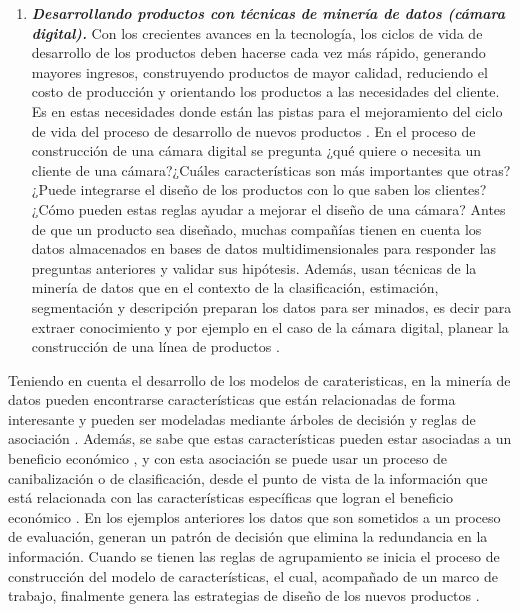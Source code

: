 \begin{enumerate}
\item \textbf{\textit{Desarrollando productos con técnicas de minería de datos (cámara digital).}} Con los crecientes avances en la tecnología, los ciclos de vida de desarrollo de los productos deben hacerse cada vez más rápido, generando mayores ingresos, construyendo productos de mayor calidad, reduciendo el costo de producción y orientando los productos a las necesidades del cliente. Es en estas necesidades donde están las pistas para el mejoramiento del ciclo de vida del proceso de desarrollo de nuevos productos \cite{Davril2015b}. En el proceso de construcción de una cámara digital se pregunta ¿qué quiere o necesita un cliente de una cámara?¿Cuáles características son más importantes que otras? ¿Puede integrarse el diseño de los productos con lo que saben los clientes? ¿Cómo pueden estas reglas ayudar a mejorar el diseño de una cámara?  Antes de que un producto sea diseñado, muchas compañías tienen en cuenta los datos almacenados en bases de datos multidimensionales para responder las preguntas anteriores y validar sus hipótesis. Además, usan técnicas de la minería de datos que en el contexto de la clasificación, estimación, segmentación y descripción preparan los datos para ser minados, es decir para extraer conocimiento y por ejemplo en el caso de la cámara digital, planear la construcción de una línea de productos \cite{Bae2011}. 

\end{enumerate}

Teniendo en cuenta el desarrollo de los modelos de carateristicas, en la minería de datos pueden encontrarse características que están relacionadas de forma interesante y pueden ser modeladas mediante árboles de decisión \cite{Farid2014} y reglas de asociación \cite{Bhuyan2015}. Además, se sabe que estas características pueden estar asociadas a un beneficio económico \cite{Jiao2005}, y con esta asociación se puede usar un proceso de canibalización o de clasificación, desde el punto de vista de la información que está relacionada con las características específicas que logran el beneficio económico \cite{Lin2013}. En los ejemplos anteriores los datos que son sometidos a un proceso de evaluación, generan un patrón de decisión que elimina la redundancia en la información. Cuando se tienen las reglas de agrupamiento se inicia el proceso de construcción del modelo de características, el cual, acompañado de un marco de trabajo, finalmente genera las estrategias de diseño de los nuevos productos \cite{Chen2014a}.

